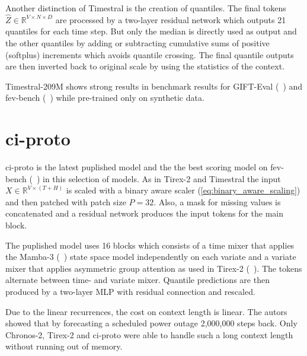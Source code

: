 Another distinction of Timestral is the creation of quantiles. The final tokens $\hat{Z} \in \mathbb{R}^{V \times N \times D}$ are processed by a two-layer residual network which outputs 21 quantiles for each time step. But only the median is directly used as output and the other quantiles by adding or subtracting cumulative sums of positive (softplus) increments which avoids quantile crossing. The final quantile outputs are then inverted back to original scale by using the statistics of the context.

Timestral-209M shows strong results in benchmark results for GIFT-Eval (\citeauthor{gifteval}~\cite{gifteval}) and fev-bench (\citeauthor{fevbench}~\cite{fevbench}) while pre-trained only on synthetic data.


\section{ci-proto}
\label{sec:foundationmodels:ciproto}

ci-proto is the latest puplished model and the the best scoring model on fev-bench (\citeauthor{fevbench}~\cite{fevbench}) in this selection of models. As in Tirex-2 and Timestral the input $X \in \mathbb{R}^{V \times (T+H)}$ is scaled with a binary aware scaler (\autoref{eq:binary_aware_scaling}) and then patched with patch size $P=32$. Also, a mask for missing values is concatenated and a residual network produces the input tokens for the main block. 

The puplished model uses 16 blocks which consists of a time mixer that applies the Mamba-3 (\citeauthor{mamba3}~\cite{mamba3}) state space model independently on each variate and a variate mixer that applies asymmetric group attention as used in Tirex-2 (\citeauthor{tirex2}~\cite{tirex2}). The tokens alternate between time- and variate mixer. Quantile predictions are then produced by a two-layer MLP with residual connection and rescaled.

Due to the linear recurrences, the cost on context length is linear. The autors \citeauthor{ciproto} showed that by forecasting a scheduled power outage 2,000,000 steps back. Only Chronos-2, Tirex-2 and ci-proto were able to handle such a long context length without running out of memory.



